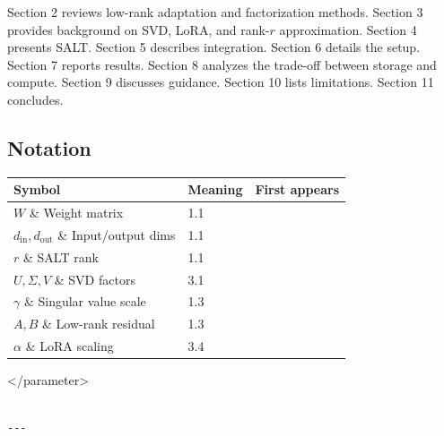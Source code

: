 Section 2 reviews low-rank adaptation and factorization methods. Section 3 
provides background on SVD, LoRA, and rank-$r$ approximation. Section 4 
presents SALT. Section 5 describes integration. Section 6 details the setup. 
Section 7 reports results. Section 8 analyzes the trade-off between storage 
and compute. Section 9 discusses guidance. Section 10 lists limitations. 
Section 11 concludes.



\subsection{Notation}

\begin{table}[H]
\centering
\small
\begin{tabular}{lll}
\toprule
\textbf{Symbol} & \textbf{Meaning} & \textbf{First appears} \\
\midrule
$W$ \& Weight matrix & 1.1 \\
$d_\text{in}, d_\text{out}$ \& Input/output dims & 1.1 \\
$r$ \& SALT rank & 1.1 \\
$U, \Sigma, V$ \& SVD factors & 3.1 \\
$\gamma$ \& Singular value scale & 1.3 \\
$A, B$ \& Low-rank residual & 1.3 \\
$\alpha$ \& LoRA scaling & 3.4 \\
\bottomrule
\end{tabular}
\end{table}
</parameter>
\begin{lstlisting}

---
\end{lstlisting}